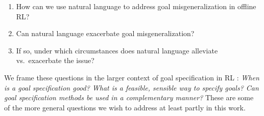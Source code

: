 \documentclass[../main.tex]{subfiles}
\begin{document}
\begin{enumerate}
  \item How can we use natural language to address goal misgeneralization in offline RL?
  \item Can natural language exacerbate goal misgeneralization?
  \item If so, under which circumstances does natural language alleviate vs.~exacerbate the issue?
\end{enumerate}

We frame these questions in the larger context of goal specification in RL
\citep{white_unifying_2017, liu_goal-conditioned_2022, bansal_specification-guided_2022}:
\textit{When is a goal specification good? What is a feasible, sensible way to specify goals? Can
goal specification methods be used in a complementary manner?} These are some of the more general
questions we wish to address at least partly in this work.

\ifSubfilesClassLoaded{%
  
}{}
\end{document}
